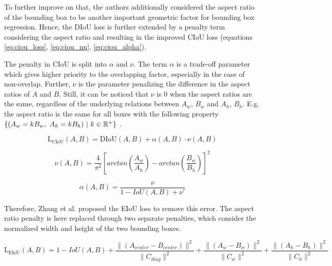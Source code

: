 To further improve on that, the authors additionally considered the aspect ratio of the bounding box to be another important geometric factor for bounding box regression.
Hence, the \ac{DIoU} loss is further extended by a penalty term considering the aspect ratio and resulting in the improved \ac{CIoU} loss (equations \ref{eq:ciou_loss}, \ref{eq:ciou_nu}, \ref{eq:ciou_alpha}).

The penalty in \ac{CIoU} is split into $\alpha$ and $\nu$.
The term $\alpha$ is a trade-off parameter which gives higher priority to the overlapping factor, especially in the case of non-overlap.
Further, $\nu$ is the parameter penalizing the difference in the aspect ratios of $A$ and $B$.
Still, it can be noticed that $\nu$ is $0$ when the aspect ratios are the same, regardless of the underlying relations between $A_w$, $B_w$ and $A_h$, $B_h$.
E.g. the aspect ratio is the same for all boxes with the following property $\{ (A_w=kB_w, \ A_h=kB_h)\ |\ k \in \mathbb{R}^+\}$ \cite{eiou}.

\begin{equation}
    \text{L}_{\text{CIoU}}(A, B) = \text{DIoU}(A, B) + \alpha(A,B) \cdot \nu(A, B)
    \label{eq:ciou_loss}
\end{equation}

\begin{equation}
    \nu(A, B) = \frac{4}{\pi^2} \left[arctan\left(\frac{A_w}{A_h}\right) - arctan\left(\frac{B_w}{B_h}\right)\right]^2
    \label{eq:ciou_nu}
\end{equation}

\begin{equation}
    \alpha(A, B) = \frac{\nu}{1 - IoU(A, B) + \nu'}
    \label{eq:ciou_alpha}
\end{equation}

Therefore, Zhang et al. \cite{eiou} proposed the \ac{EIoU} loss to remove this error.
The aspect ratio penalty is here replaced through two separate penalties, which consider the normalized width and height of the two bounding boxes.

\begin{equation}
    \text{L}_{\text{EIoU}}(A, B) = 1 - IoU(A, B) + \frac{\|(A_{center} - B_{center})\|^2}{\|C_{diag}\|^2} + \frac{\|(A_{w} - B_{w})\|^2}{\|C_w\|^2} + \frac{\|(A_{h} - B_{h})\|^2}{\|C_h\|^2}
    \label{eq:eiou_loss}
\end{equation}
